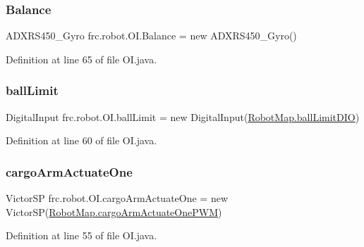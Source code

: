 \subsubsection{\texorpdfstring{Balance}{Balance}}
{\footnotesize\ttfamily A\+D\+X\+R\+S450\+\_\+\+Gyro frc.\+robot.\+O\+I.\+Balance = new A\+D\+X\+R\+S450\+\_\+\+Gyro()\hspace{0.3cm}{\ttfamily [static]}}



Definition at line 65 of file O\+I.\+java.

\mbox{\label{classfrc_1_1robot_1_1OI_aebf7c01734a48f269b40f7b1f1125f10}} 
\subsubsection{\texorpdfstring{ball\+Limit}{ballLimit}}
{\footnotesize\ttfamily Digital\+Input frc.\+robot.\+O\+I.\+ball\+Limit = new Digital\+Input(\hyperlink{classfrc_1_1robot_1_1RobotMap_a83f3eec03443af1dbe44492871796c92}{Robot\+Map.\+ball\+Limit\+D\+IO})\hspace{0.3cm}{\ttfamily [static]}}



Definition at line 60 of file O\+I.\+java.

\mbox{\label{classfrc_1_1robot_1_1OI_aeee9fe6efef4ea8f2558ccd2de43e71a}} 
\subsubsection{\texorpdfstring{cargo\+Arm\+Actuate\+One}{cargoArmActuateOne}}
{\footnotesize\ttfamily Victor\+SP frc.\+robot.\+O\+I.\+cargo\+Arm\+Actuate\+One = new Victor\+SP(\hyperlink{classfrc_1_1robot_1_1RobotMap_aaff9d0adef8e1f97db2ac47f985f044a}{Robot\+Map.\+cargo\+Arm\+Actuate\+One\+P\+WM})\hspace{0.3cm}{\ttfamily [static]}}



Definition at line 55 of file O\+I.\+java.

\mbox{\label{classfrc_1_1robot_1_1OI_a7ec725773fd1bb5dc4263980a232e75f}} 

